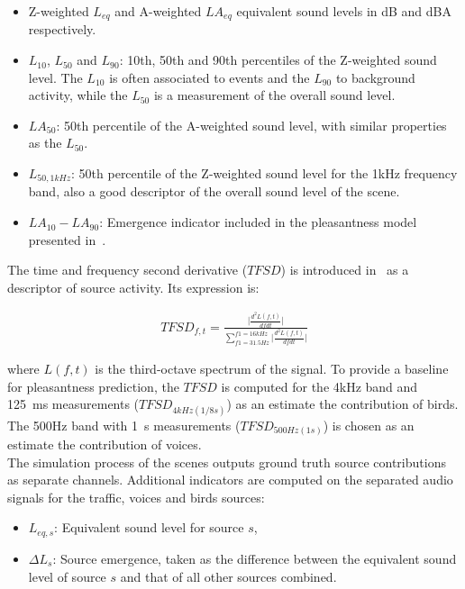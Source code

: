 \documentclass[twocolumn]{article}
\begin{document}
\begin{itemize}
\item Z-weighted $L_{eq}$ and A-weighted $LA_{eq}$ equivalent sound levels in dB and dBA respectively.
\item $L_{10}$, $L_{50}$ and $L_{90}$: 10th, 50th and 90th percentiles of the Z-weighted sound level. The $L_{10}$ is often associated to events and the $L_{90}$ to background activity, while the $L_{50}$ is a measurement of the overall sound level.
\item $LA_{50}$: 50th percentile of the A-weighted sound level, with similar properties as the $L_{50}$.
\item $L_{50, 1kHz}$: 50th percentile of the Z-weighted sound level for the 1kHz frequency band, also a good descriptor of the overall sound level of the scene.
\item $LA_{10}-LA_{90}$: Emergence indicator included in the pleasantness model presented in~\cite{ricciardi2014}.
\end{itemize}

The time and frequency second derivative ($TFSD$) is introduced in~\cite{aumond2017} as a descriptor of source activity. Its expression is:

\begin{align}
TFSD_{f, t} = \frac{\lvert\frac{d^2L(f, t)}{dfdt}\rvert}{\sum_{f1=31.5Hz}^{f1=16kHz}\lvert\frac{d^2L(f, t)}{dfdt}\rvert}
\end{align}

where $L(f, t)$ is the third-octave spectrum of the signal. To provide a baseline for pleasantness prediction, the $TFSD$ is computed for the 4kHz band and 125~ms measurements ($TFSD_{4kHz(1/8s)}$) as an estimate the contribution of birds. The 500Hz band with 1~s measurements ($TFSD_{500Hz(1s)}$) is chosen as an estimate the contribution of voices.\\

The simulation process of the scenes outputs ground truth source contributions as separate channels. Additional indicators are computed on the separated audio signals for the traffic, voices and birds sources:

\begin{itemize}
\item $L_{eq, s}$: Equivalent sound level for source $s$,
\item $\Delta L_{s}$: Source emergence, taken as the difference between the equivalent sound level of source $s$ and that of all other sources combined.
\end{itemize}
\end{document}
